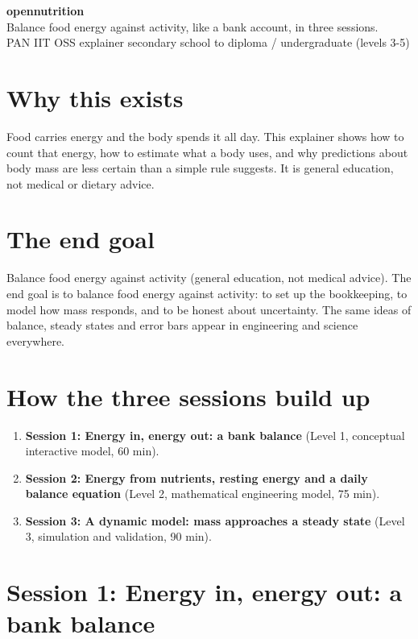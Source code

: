 \documentclass[11pt,a4paper]{article}
\begin{document}
\begin{center}{\LARGE\bfseries opennutrition}\\[0.4em]{\large Balance food energy against activity, like a bank account, in three sessions.}\\[0.2em]\small PAN IIT OSS explainer \textbullet{} secondary school to diploma / undergraduate (levels 3-5)\end{center}

\section*{Why this exists}
Food carries energy and the body spends it all day. This explainer shows how to count that energy, how to estimate what a body uses, and why predictions about body mass are less certain than a simple rule suggests. It is general education, not medical or dietary advice.

\section*{The end goal}
Balance food energy against activity (general education, not medical advice). The end goal is to balance food energy against activity: to set up the bookkeeping, to model how mass responds, and to be honest about uncertainty. The same ideas of balance, steady states and error bars appear in engineering and science everywhere.

\section*{How the three sessions build up}
\begin{enumerate}[nosep]
\item \textbf{Session 1: Energy in, energy out: a bank balance} (Level 1, conceptual interactive model, 60 min).
\item \textbf{Session 2: Energy from nutrients, resting energy and a daily balance equation} (Level 2, mathematical engineering model, 75 min).
\item \textbf{Session 3: A dynamic model: mass approaches a steady state} (Level 3, simulation and validation, 90 min).
\end{enumerate}

\section{Session 1: Energy in, energy out: a bank balance}
\end{document}

